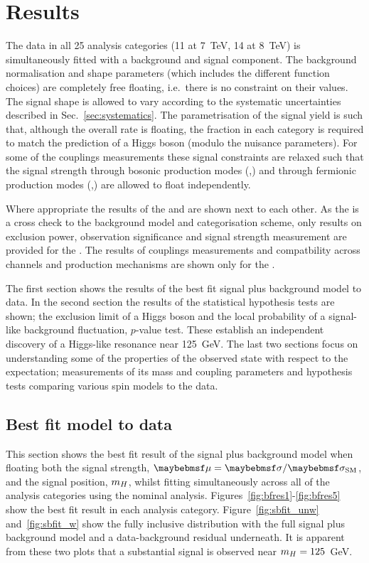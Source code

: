 \chapter{Results}
\label{chap:results}

The data in all 25 analysis categories (11 at 7~TeV, 14 at 8~TeV) is simultaneously fitted with a background and signal component. The background normalisation and shape parameters (which includes the different function choices) are completely free floating, i.e.~there is no constraint on their values. The signal shape is allowed to vary according to the systematic uncertainties described in Sec.~\ref{sec:systematics}. The parametrisation of the signal yield is such that, although the overall rate is floating, the fraction in each category is required to match the prediction of a \SM Higgs boson (modulo the nuisance parameters). For some of the couplings measurements these signal constraints are relaxed such that the signal strength through bosonic production modes (\VBF,\VH) and through fermionic production modes (\ggH,\ttH) are allowed to float independently. 

Where appropriate the results of the \MFM and \SMVA are shown next to each other. As the \SMVA is a cross check to the background model and categorisation scheme, only results on exclusion power, observation significance and signal strength measurement are provided for the \SMVA. The results of couplings measurements and compatbility across channels and production mechanisms are shown only for the \MFM.

The first section shows the results of the best fit signal plus background model to data. In the second section the results of the statistical hypothesis tests are shown; the exclusion limit of a \SM Higgs boson and the local probability of a signal-like background fluctuation, $p$-value test. These establish an independent discovery of a Higgs-like resonance near 125~GeV. The last two sections focus on understanding some of the properties of the observed state with respect to the \SM expectation; measurements of its mass and coupling parameters and hypothesis tests comparing various spin models to the data.

\section{Best fit model to data}

This section shows the best fit result of the signal plus background model when floating both the signal strength, $\mu=\musm$, and the signal position, $m_{H}$, whilst fitting simultaneously across all of the analysis categories using the nominal \MFM analysis. Figures~\ref{fig:bfres1}-\ref{fig:bfres5} show the best fit result in each analysis category. Figure~\ref{fig:sbfit_unw} and~\ref{fig:sbfit_w} show the fully inclusive distribution with the full signal plus background model and a data-background residual underneath. It is apparent from these two plots that a substantial signal is observed near $m_{H}=125$~GeV.

